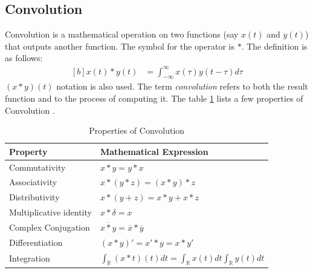 \documentclass[letterpaper, 11pt]{article}
\newcommand{\fint}{\int_{-\infty}^{\infty}} %
\newcommand{\conv}[4]{\fint #3(#2)#4(#1 - #2) d#2} %
\numberwithin{equation}{section}
\numberwithin{figure}{section}
\numberwithin{table}{section}
\begin{document}
\subsection{Convolution}
Convolution is a mathematical operation on two functions (say \(x(t)\) and \(y(t)\)) that outputs another function. The symbol for the operator is \(*\). The definition is as follows:
\begin{equation}
	\begin{aligned}[b]
		x(t)*y(t)
			&= \conv{t}{\tau}{x}{y}
			\label{eq:convolution}
	\end{aligned}
\end{equation}
\((x*y)(t)\) notation is also used. The term \emph{convolution} refers to both the result function and to the process of computing it. The table \ref{tab:convolution} lists a few properties of Convolution \cite{arfken}.
\begin{table}
	\centering
	\caption[optional argument]{Properties of Convolution}
	\begin{tabular}{|l|l|}
		\hline
		Property	& Mathematical Expression\\
		\hline
		Commutativity	& \(x*y = y*x\) \\
		\hline
		Associativity	& \(x*(y*z) = (x*y)*z \) \\
		\hline
		Distributivity	& \(x*(y + z) = x*y + x*z \) \\
		\hline
		Multiplicative identity	& \(x*\delta = x \)\\
		\hline
		Complex Conjugation	& \(\overline{x*y} = \overline{x}*\overline{y}\) \\
		\hline
		Differentiation	& \((x*y)' = x'*y = x*y' \) \\
		\hline
		Integration	& \(\int_{\mathbb{R}}(x*t)(t) dt
					= \int_{\mathbb{R}} x(t) dt
					  \int_{\mathbb{R}} y(t) dt\) \\
		\hline
	\end{tabular}
	\label{tab:convolution}
\end{table}

\end{document}

